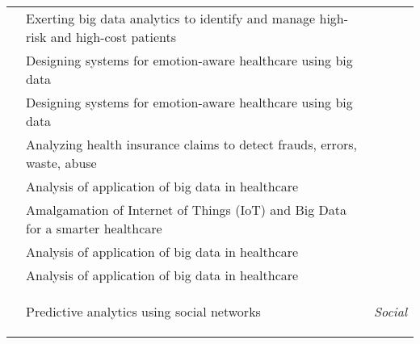\begin{center}
\begin{longtable}{|p{4cm}|p{8cm}|p{1cm}|}
        \cite{Bates2014}           & Exerting big data analytics to identify and manage high-risk and high-cost patients                                                           &                                             \\

        \cite{Lin2016}             & Designing systems for emotion-aware healthcare using big data                                                                                 &                                             \\

        \cite{Lin2016}             & Designing systems for emotion-aware healthcare using big data                                                                                 &                                             \\

        \cite{Srinivasan2013}      & Analyzing health insurance claims to detect frauds, errors, waste, abuse                                                                      &                                             \\

        \cite{Mehta2018}           & Analysis of application of big data in healthcare                                                                                             &                                             \\

        \cite{firouzi2018internet} & Amalgamation of Internet of Things (IoT) and Big Data for a smarter healthcare                                                                &                                             \\

        \cite{firouzi2018internet} & Analysis of application of big data in healthcare                                                                                             &                                             \\

        \cite{Chen2018}            & Analysis of application of big data in healthcare                                                                                             &                                             \\

        \hline
        \cite{asur2010predicting}  & Predictive analytics using social networks                                                                                                    & \multirow{5}{*}{\begin{turn}{-90} \textit{Social} \end{turn}}  \\


\end{longtable}
\end{center}
